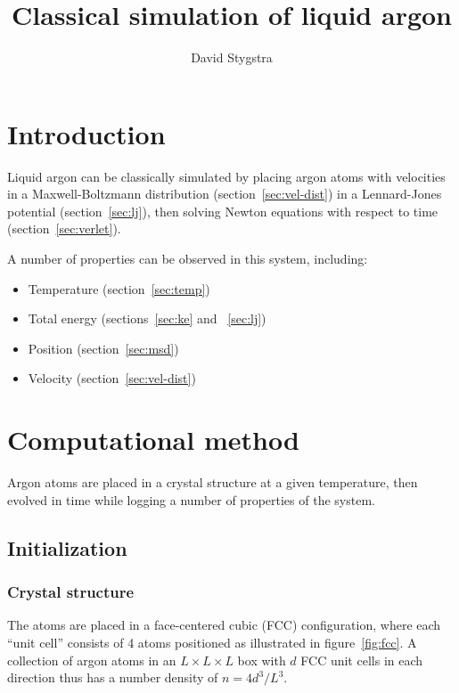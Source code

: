\documentclass[twocolumn]{revtex4}
\begin{document}
\title{Classical simulation of liquid argon}
\author{David Stygstra}

\maketitle

\section{Introduction}

Liquid argon can be classically simulated by placing argon atoms with velocities in a Maxwell-Boltzmann distribution (section~\ref{sec:vel-dist}) in a Lennard-Jones potential (section~\ref{sec:lj}), then solving Newton equations with respect to time (section~\ref{sec:verlet}).

A number of properties can be observed in this system, including:

\begin{itemize}
\item Temperature (section~\ref{sec:temp})
\item Total energy (sections~\ref{sec:ke} and ~\ref{sec:lj})
\item Position (section~\ref{sec:msd})
\item Velocity (section~\ref{sec:vel-dist})
\end{itemize}

\section{Computational method}

Argon atoms are placed in a crystal structure at a given temperature, then evolved in time while logging a number of properties of the system.

\subsection{Initialization}

\subsubsection{Crystal structure}

The atoms are placed in a face-centered cubic (FCC) configuration, where each ``unit cell'' consists of 4 atoms positioned as illustrated in figure~\ref{fig:fcc}. A collection of argon atoms in an $L \times L \times L$ box with $d$ FCC unit cells in each direction thus has a number density of $n = 4d^3/L^3$.
\end{document}
